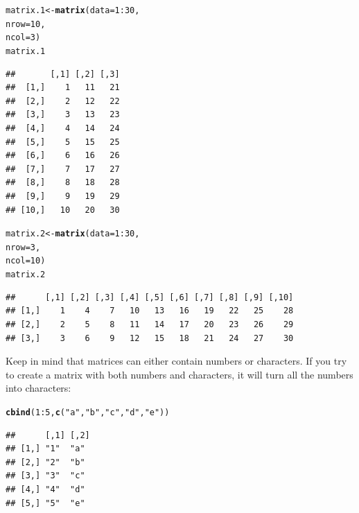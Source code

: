 \documentclass{tufte-book}\usepackage[]{graphicx}\usepackage[]{color}
\makeatletter
\newcommand{\hlnum}[1]{\textcolor[rgb]{0.686,0.059,0.569}{#1}}%
\newcommand{\hlstr}[1]{\textcolor[rgb]{0.192,0.494,0.8}{#1}}%
\newcommand{\hlopt}[1]{\textcolor[rgb]{0,0,0}{#1}}%
\newcommand{\hlstd}[1]{\textcolor[rgb]{0.345,0.345,0.345}{#1}}%
\newcommand{\hlkwb}[1]{\textcolor[rgb]{0.69,0.353,0.396}{#1}}%
\newcommand{\hlkwc}[1]{\textcolor[rgb]{0.333,0.667,0.333}{#1}}%
\newcommand{\hlkwd}[1]{\textcolor[rgb]{0.737,0.353,0.396}{\textbf{#1}}}%
\newenvironment{kframe}{%
 \def\at@end@of@kframe{}%
 \ifinner\ifhmode%
  \def\at@end@of@kframe{\end{minipage}}%
  \begin{minipage}{\columnwidth}%
 \fi\fi%
 \def\FrameCommand##1{\hskip\@totalleftmargin \hskip-\fboxsep
 \colorbox{shadecolor}{##1}\hskip-\fboxsep
     \hskip-\linewidth \hskip-\@totalleftmargin \hskip\columnwidth}%
 \MakeFramed {\advance\hsize-\width
   \@totalleftmargin\z@ \linewidth\hsize
   \@setminipage}}%
 {\par\unskip\endMakeFramed%
 \at@end@of@kframe}
\newenvironment{knitrout}{}{} %
\makeatother
\begin{document}
\begin{footnotesize}
\begin{knitrout}
\color{fgcolor}\begin{kframe}
\begin{alltt}
\hlstd{matrix.1} \hlkwb{<-} \hlkwd{matrix}\hlstd{(}\hlkwc{data} \hlstd{=} \hlnum{1}\hlopt{:}\hlnum{30}\hlstd{,}
                   \hlkwc{nrow} \hlstd{=} \hlnum{10}\hlstd{,}
                   \hlkwc{ncol} \hlstd{=} \hlnum{3}\hlstd{)}
\hlstd{matrix.1}
\end{alltt}
\begin{verbatim}
##       [,1] [,2] [,3]
##  [1,]    1   11   21
##  [2,]    2   12   22
##  [3,]    3   13   23
##  [4,]    4   14   24
##  [5,]    5   15   25
##  [6,]    6   16   26
##  [7,]    7   17   27
##  [8,]    8   18   28
##  [9,]    9   19   29
## [10,]   10   20   30
\end{verbatim}
\begin{alltt}
\hlstd{matrix.2} \hlkwb{<-} \hlkwd{matrix}\hlstd{(}\hlkwc{data} \hlstd{=} \hlnum{1}\hlopt{:}\hlnum{30}\hlstd{,}
                   \hlkwc{nrow} \hlstd{=} \hlnum{3}\hlstd{,}
                   \hlkwc{ncol} \hlstd{=} \hlnum{10}\hlstd{)}
\hlstd{matrix.2}
\end{alltt}
\begin{verbatim}
##      [,1] [,2] [,3] [,4] [,5] [,6] [,7] [,8] [,9] [,10]
## [1,]    1    4    7   10   13   16   19   22   25    28
## [2,]    2    5    8   11   14   17   20   23   26    29
## [3,]    3    6    9   12   15   18   21   24   27    30
\end{verbatim}
\end{kframe}
\end{knitrout}
\end{footnotesize}

Keep in mind that matrices can either contain numbers or characters. If you try to create a matrix with both numbers and characters, it will turn all the numbers into characters:

\begin{footnotesize}
\begin{knitrout}
\color{fgcolor}\begin{kframe}
\begin{alltt}
\hlkwd{cbind}\hlstd{(}\hlnum{1}\hlopt{:}\hlnum{5}\hlstd{,} \hlkwd{c}\hlstd{(}\hlstr{"a"}\hlstd{,} \hlstr{"b"}\hlstd{,} \hlstr{"c"}\hlstd{,} \hlstr{"d"}\hlstd{,} \hlstr{"e"}\hlstd{))}
\end{alltt}
\begin{verbatim}
##      [,1] [,2]
## [1,] "1"  "a" 
## [2,] "2"  "b" 
## [3,] "3"  "c" 
## [4,] "4"  "d" 
## [5,] "5"  "e"
\end{verbatim}
\end{kframe}
\end{knitrout}
\end{footnotesize}
\end{document}
